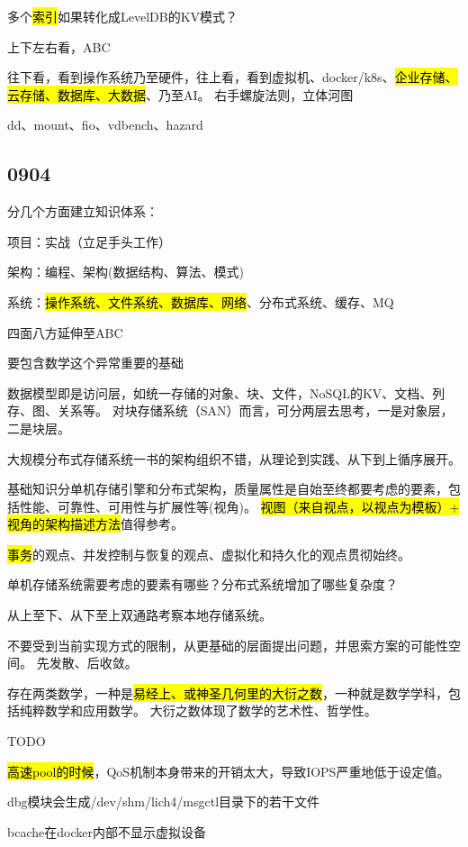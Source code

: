 多个\hl{索引}如果转化成LevelDB的KV模式？

上下左右看，ABC

往下看，看到操作系统乃至硬件，往上看，看到虚拟机、docker/k8s、\hl{企业存储、云存储、数据库、大数据}、乃至AI。
右手螺旋法则，立体河图

dd、mount、fio、vdbench、hazard

\subsection{0904}

分几个方面建立知识体系：
\begin{enumbox}
\item 项目：实战（立足手头工作）
\item 架构：编程、架构(数据结构、算法、模式)
\item 系统：\hl{操作系统、文件系统、数据库、网络}、分布式系统、缓存、MQ
\item 四面八方延伸至ABC
\item 要包含数学这个异常重要的基础
\end{enumbox}

数据模型即是访问层，如统一存储的对象、块、文件，NoSQL的KV、文档、列存、图、关系等。
对块存储系统（SAN）而言，可分两层去思考，一是对象层，二是块层。

大规模分布式存储系统一书的架构组织不错，从理论到实践、从下到上循序展开。

基础知识分单机存储引擎和分布式架构，质量属性是自始至终都要考虑的要素，包括性能、可靠性、可用性与扩展性等(视角)。
\hl{视图（来自视点，以视点为模板）+ 视角的架构描述方法}值得参考。

\hl{事务}的观点、并发控制与恢复的观点、虚拟化和持久化的观点贯彻始终。

单机存储系统需要考虑的要素有哪些？分布式系统增加了哪些复杂度？

从上至下、从下至上双通路考察本地存储系统。

不要受到当前实现方式的限制，从更基础的层面提出问题，并思索方案的可能性空间。
先发散、后收敛。

存在两类数学，一种是\hl{易经上、或神圣几何里的大衍之数}，一种就是数学学科，包括纯粹数学和应用数学。
大衍之数体现了数学的艺术性、哲学性。

TODO
\begin{enumbox}
\item \hl{高速pool的时候}，QoS机制本身带来的开销太大，导致IOPS严重地低于设定值。
\item dbg模块会生成/dev/shm/lich4/msgctl目录下的若干文件
\item bcache在docker内部不显示虚拟设备
\end{enumbox}

